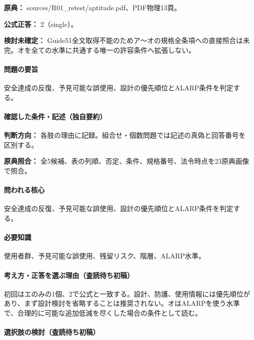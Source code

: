 \noindent\textbf{原典：} sources/R01\_retest/aptitude.pdf、PDF物理13頁。

\textbf{公式正答：} 2（single）。

\par\textbf{検討未確定：} Guide51全文取得不能のためア〜オの規格全条項への直接照合は未完。オを全ての水準に共通する唯一の許容条件へ拡張しない。

\paragraph{問題の要旨} 安全達成の反復、予見可能な誤使用、設計の優先順位とALARP条件を判定する。

\paragraph{確認した条件・記述（独自要約）}\mbox{}\par

\noindent\textbf{判断方向：} 各肢の理由に記録。組合せ・個数問題では記述の真偽と回答番号を区別する。\par

\noindent\textbf{原典照合：} 全5候補、表の列順、否定、条件、規格番号、法令時点を23原典画像で照合。\par

\paragraph{問われる核心} 安全達成の反復、予見可能な誤使用、設計の優先順位とALARP条件を判定する。

\paragraph{必要知識} 使用者群、予見可能な誤使用、残留リスク、階層、ALARP水準。

\paragraph{考え方・正答を選ぶ理由（査読待ち初稿）} 初回はエのみの1個、2で公式と一致する。設計、防護、使用情報には優先順位があり、まず設計検討を省略することは推奨されない。オはALARPを使う水準で、合理的に可能な追加低減を尽くした場合の条件として読む。

\paragraph{選択肢の検討（査読待ち初稿）}\mbox{}\par

